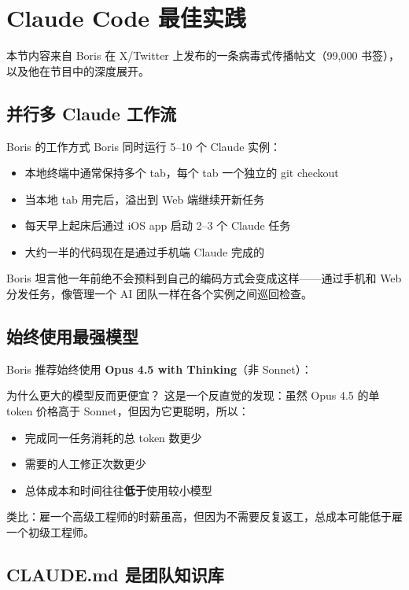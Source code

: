 \section{Claude Code 最佳实践}

本节内容来自 Boris 在 X/Twitter 上发布的一条病毒式传播帖文（99,000 书签），以及他在节目中的深度展开。

\subsection{并行多 Claude 工作流}

\begin{importantbox}{Boris 的工作方式}
Boris 同时运行 5--10 个 Claude 实例：
\begin{itemize}
    \item 本地终端中通常保持多个 tab，每个 tab 一个独立的 git checkout
    \item 当本地 tab 用完后，溢出到 Web 端继续开新任务
    \item 每天早上起床后通过 iOS app 启动 2--3 个 Claude 任务
    \item 大约一半的代码现在是通过手机端 Claude 完成的
\end{itemize}
\end{importantbox}

Boris 坦言他一年前绝不会预料到自己的编码方式会变成这样——通过手机和 Web 分发任务，像管理一个 AI 团队一样在各个实例之间巡回检查。

\subsection{始终使用最强模型}

Boris 推荐始终使用 \textbf{Opus 4.5 with Thinking}（非 Sonnet）：

\begin{knowledgebox}{为什么更大的模型反而更便宜？}
这是一个反直觉的发现：虽然 Opus 4.5 的单 token 价格高于 Sonnet，但因为它更聪明，所以：
\begin{itemize}
    \item 完成同一任务消耗的总 token 数更少
    \item 需要的人工修正次数更少
    \item 总体成本和时间往往\textbf{低于}使用较小模型
\end{itemize}
类比：雇一个高级工程师的时薪虽高，但因为不需要反复返工，总成本可能低于雇一个初级工程师。
\end{knowledgebox}

\subsection{CLAUDE.md 是团队知识库}


